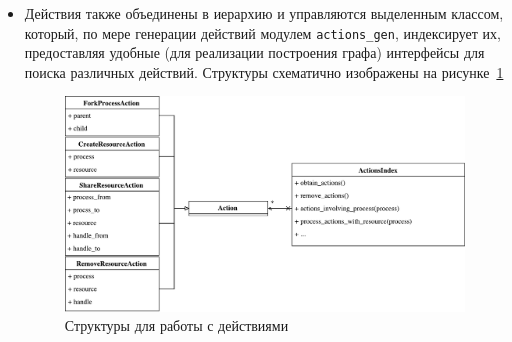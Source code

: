 \begin{itemize}
	\item Действия также объединены в иерархию и управляются выделенным классом, который, по мере генерации действий модулем \texttt{actions\_gen}, индексирует их, предоставляя удобные (для реализации построения графа) интерфейсы для поиска различных действий. Структуры схематично изображены на рисунке~\ref{chap2:fig:actsstructs}

\begin{figure}[ht!]
\centering
\includegraphics[scale=0.6]{fig/actionsStruct.pdf}
\caption{Структуры для работы с действиями}
\label{chap2:fig:actsstructs}
\end{figure}

\end{itemize}











